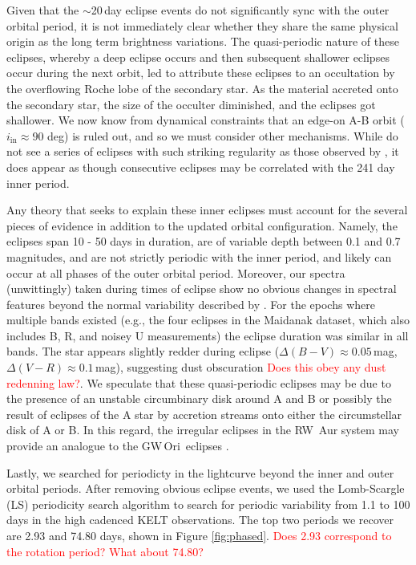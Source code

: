 \documentclass[twocolumn]{aastex61}
\newcommand{\todo}[1]{ \textcolor{red}{#1}}
\newcommand{\obj}{GW\,Ori}
\begin{document}
Given that the $\sim$20\,day eclipse events do not significantly sync with the outer orbital period, it is not immediately clear whether they share the same physical origin as the long term brightness variations. The quasi-periodic nature of these eclipses, whereby a deep eclipse occurs and then subsequent shallower eclipses occur during the next orbit, led \citet{shevchenko98} to attribute these eclipses to an occultation by the overflowing Roche lobe of the secondary star. As the material accreted onto the secondary star, the size of the occulter diminished, and the eclipses got shallower. We now know from dynamical constraints that an edge-on A-B orbit ($i_\mathrm{in} \approx 90$ deg) is ruled out, and so we must consider other mechanisms. While do not see a series of eclipses with such striking regularity as those observed by \citet{shevchenko98}, it does appear as though consecutive eclipses may be correlated with the 241 day inner period.

Any theory that seeks to explain these inner eclipses must account for the several pieces of evidence in addition to the updated orbital configuration. Namely, the eclipses span 10 - 50 days in duration, are of variable depth between 0.1 and 0.7 magnitudes, and are not strictly periodic with the inner period, and likely can occur at all phases of the outer orbital period. Moreover, our spectra (unwittingly) taken during times of eclipse show no obvious changes in spectral features beyond the normal variability described by \citet{fang14}. For the epochs where multiple bands existed (e.g., the four eclipses in the Maidanak dataset, which also includes B, R, and noisey U measurements) the eclipse duration was similar in all bands. The star appears slightly redder during eclipse ($\Delta (B - V)\approx 0.05$\,mag, $\Delta (V - R) \approx 0.1$\,mag), suggesting dust obscuration \todo{Does this obey any dust redenning law?}. We speculate that these quasi-periodic eclipses may be due to the presence of an unstable circumbinary disk around A and B or possibly the result of eclipses of the A star by accretion streams onto either the circumstellar disk of A or B. In this regard, the irregular eclipses in the RW~Aur system may provide an analogue to the \obj\ eclipses \citep{rodriguez16}.

Lastly, we searched for periodicty in the lightcurve beyond the inner and outer orbital periods.
After removing obvious eclipse events, we used the Lomb-Scargle (LS) periodicity search algorithm \citep{lomb76,scargle82}  \citep[within the VARTOOLS analysis package;][]{Hartman:12} to search for periodic variability from 1.1 to 100 days in the high cadenced KELT observations. The top two periods we recover are 2.93 and 74.80 days, shown in Figure \ref{fig:phased}. \todo{Does 2.93 correspond to the rotation period? What about 74.80?}
\end{document}
